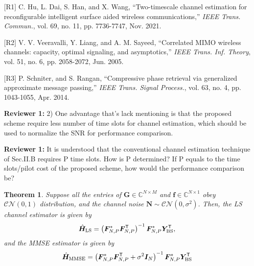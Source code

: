 \documentclass[a4paper,12pt]{article}
\newtheorem{theorem}{\bf Theorem}
\def \T {^{\mathsf{T}}}
\begin{document}
{{[R1] C. Hu, L. Dai, S. Han, and X. Wang, ``Two-timescale channel estimation for  reconfigurable intelligent  surface  aided  wireless  communications,'' {\it IEEE Trans. Commun.}, vol. 69, no. 11, pp. 7736-7747, Nov. 2021.

[R2] V. V. Veeravalli, Y. Liang, and A. M. Sayeed, ``Correlated MIMO wireless channels: capacity, optimal signaling, and asymptotics,'' {\it IEEE Trans. Inf. Theory}, vol. 51, no. 6, pp. 2058-2072, Jun. 2005. 

[R3] P. Schniter, and S. Rangan, ``Compressive phase retrieval via generalized approximate message passing,'' {\it IEEE Trans. Signal Process.}, vol. 63, no. 4, pp. 1043-1055, Apr. 2014. 

}}

\textbf{Reviewer 1:}
2) One advantage that's lack mentioning is that the proposed scheme require less number of time slots for channel estimation, which should be used to normalize the SNR for performance comparison.

{}

\textbf{Reviewer 1:}
It is understood that the conventional channel estimation technique of Sec.II.B requires P time slots. How is P determined? If P equals to the time slots/pilot cost of the proposed scheme, how would the performance comparison be?

{}


\begin{theorem} 
    Suppose all the entries of ${\bm G}\in\mathbb{C}^{N\times M}$ and ${\bm f}\in\mathbb{C}^{N\times 1}$ obey ${\mathcal{CN}(0,1)}$ distribution, and the channel noise ${\bm N}\sim \mathcal{CN}(0,\sigma^2)$. 
    Then, the LS channel estimator is given by 
    \begin{equation}
        \hat{\bm{H}}_{\rm LS} = \left( {\bm F}_{N,P}^{*} {\bm F_{N,P}\T} \right)^{-1}{\bm F}_{N,P}^{*}{\bm Y}_{\rm BS}\T,
    \end{equation}
    and the MMSE estimator is given by 
    \begin{equation}
        \hat{\bm{H}}_{\rm MMSE} = \left( {\bm F}_{N,P}^{*} {\bm F_{N,P}\T + \sigma^2 {\bm I}_N} \right)^{-1}{\bm F}_{N,P}^{*}{\bm Y}_{\rm BS}\T
    \end{equation}
\end{theorem}
\end{document}
